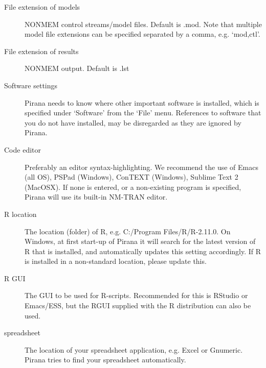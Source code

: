 \begin{description}
\item[File extension of models] NONMEM control streams/model files. Default is .mod. Note that multiple
model file extensions can be specified separated by a comma, e.g. `mod,ctl'.
\item[File extension of results] NONMEM output. Default is .lst

\item[Software settings] Pirana needs to know where other important software is installed,
which is specified under `Software' from the `File' menu. References
to software that you do not have installed, may be disregarded as they
are ignored by Pirana.

\item[Code editor] Preferably an editor syntax-highlighting. We
  recommend the use of Emacs (all OS), PSPad (Windows), ConTEXT (Windows), Sublime Text 2 (MacOSX). If none is
  entered, or a non-existing program is specified, Pirana will use its
  built-in NM-TRAN editor.
\item[R location] The location (folder) of R, e.g. C:/Program
  Files/R/R-2.11.0. On Windows, at first start-up of Pirana it will
  search for the latest version of R that is installed, and
  automatically updates this setting accordingly. If R is installed in
  a non-standard location, please update this.
\item[R GUI] The GUI to be used for R-scripts. Recommended for this is
  RStudio or Emacs/ESS, but the RGUI supplied with the R distribution
  can also be used.
\item[spreadsheet] The location of your spreadsheet application,
    e.g. Excel or Gnumeric. Pirana tries to find your spreadsheet
    automatically.
\end{description}

